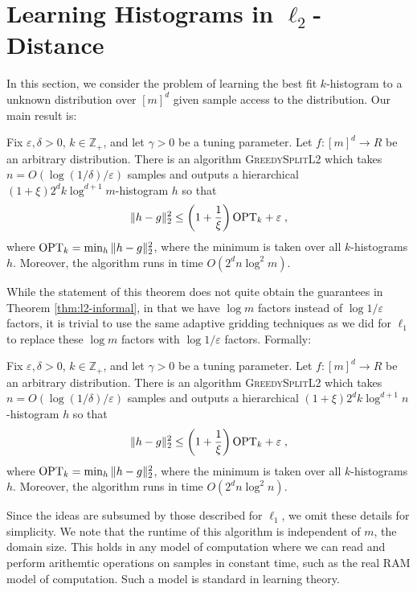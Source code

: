 \documentclass[final,12pt]{colt2018} %
\newcommand{\eps}{\varepsilon}
\begin{document}


\newpage

\appendix

\section{Learning Histograms in $\ell_2$-Distance}
In this section, we consider the problem of learning the best fit $k$-histogram 
to a unknown distribution over $[m]^d$ given sample access to the distribution.
Our main result is:
\begin{theorem}
\label{thm:l2-main}
Fix $\eps, \delta > 0$, $k \in \mathbb{Z}_+$, and let $\gamma > 0$ be a tuning parameter.
Let $f: [m]^d \to R$ be an arbitrary distribution.
There is an algorithm \textsc{GreedySplitL2} which takes $n = O(\log (1 / \delta) / \eps )$ samples 
and outputs a hierarchical $(1 + \xi) 2^d k \log^{d + 1} m$-histogram $h$ so that
\[
\| h - g \|_2^2 \leq \left( 1 + \frac{1}{\xi} \right) \OPT_k + \eps \; ,
\]
where $\mathrm{OPT}_{k} = \min_{h} \| h - g \|_{2}^2$,
where the minimum is taken over all $k$-histograms $h$.
Moreover, the algorithm runs in time $O (2^d n \log^2 m)$.
\end{theorem}

While the statement of this theorem does not quite obtain the guarantees in Theorem \ref{thm:l2-informal}, in that we have $\log m$ factors instead of $\log 1 / \eps$ factors, it is trivial to use the same adaptive gridding techniques as we did for $\ell_1$ to replace these $\log m$ factors with $\log 1 / \eps $ factors.
Formally:
\begin{theorem}
\label{thm:l2-main-adaptive}
Fix $\eps, \delta > 0$, $k \in \mathbb{Z}_+$, and let $\gamma > 0$ be a tuning parameter.
Let $f: [m]^d \to R$ be an arbitrary distribution.
There is an algorithm \textsc{GreedySplitL2} which takes $n = O(\log (1 / \delta) / \eps )$ samples 
and outputs a hierarchical $(1 + \xi) 2^d k \log^{d + 1} n$-histogram $h$ so that
\[
\| h - g \|_2^2 \leq \left( 1 + \frac{1}{\xi} \right) \OPT_k + \eps \; ,
\]
where $\mathrm{OPT}_{k} = \min_{h} \| h - g \|_{2}^2$,
where the minimum is taken over all $k$-histograms $h$.
Moreover, the algorithm runs in time $O (2^d n \log^2 n)$.
\end{theorem}
Since the ideas are subsumed by those described for $\ell_1$, we omit these details for simplicity.
We note that the runtime of this algorithm is independent of $m$, the domain size.
This holds in any model of computation where we can read and perform arithemtic operations on samples in constant time, such as the real RAM model of computation.
Such a model is standard in learning theory.
\end{document}
